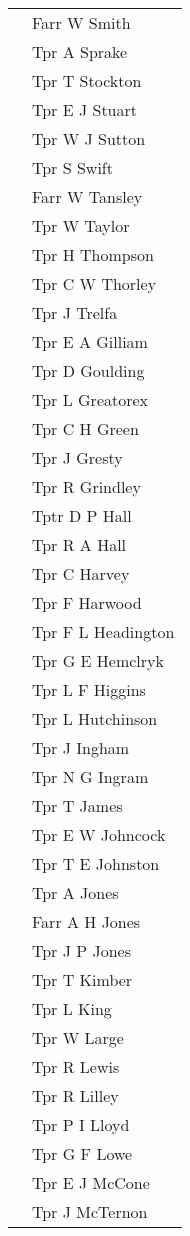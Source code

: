 \begin{center}
\begin{tabular}{rl}
    & Farr W Smith \\
    & Tpr A Sprake \\
    & Tpr T Stockton \\
    & Tpr E J Stuart \\
    & Tpr W J Sutton \\
    & Tpr S Swift \\
    & Farr W Tansley \\
    & Tpr W Taylor \\
    & Tpr H Thompson \\
    & Tpr C W Thorley \\
    & Tpr J Trelfa \\
    & Tpr E A Gilliam \\
    & Tpr D Goulding \\
    & Tpr L Greatorex \\
    & Tpr C H Green \\
    & Tpr J Gresty \\
    & Tpr R Grindley \\
    & Tptr D P Hall \\
    & Tpr R A Hall \\
    & Tpr C Harvey \\
    & Tpr F Harwood \\
    & Tpr F L Headington \\
    & Tpr G E Hemclryk \\
    & Tpr L F Higgins \\
    & Tpr L Hutchinson \\
    & Tpr J Ingham \\
    & Tpr N G Ingram \\
    & Tpr T James \\
    & Tpr E W Johncock \\
    & Tpr T E Johnston \\
    & Tpr A Jones \\
    & Farr A H Jones \\
    & Tpr J P Jones \\
    & Tpr T Kimber \\
    & Tpr L King \\
    & Tpr W Large \\
    & Tpr R Lewis \\
    & Tpr R Lilley \\
    & Tpr P I Lloyd \\
    & Tpr G F Lowe \\
    & Tpr E J McCone \\
    & Tpr J McTernon \\

\end{tabular}
\end{center}
